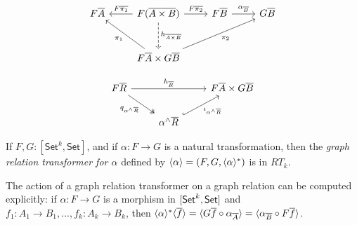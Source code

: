 \documentclass[runningheads]{llncs}
\newcommand{\set}{\mathsf{Set}}
\begin{document}
\begin{figure*}[ht]
\vspace*{-0.3in}
  \begin{minipage}[b]{0.25\linewidth}
{\footnotesize\[\begin{tikzcd}[row sep = large]
        F\overline{A}
        &F(\overline{A \times B})
        \ar[l, "{F\overline{\pi_1}}"']
        \ar[r, "{F\overline{\pi_2}}"]
        \ar[d, dashed, "{h_{\overline{A \times B}}}"]
        &F\overline{B}
        \ar[r, "{\alpha_{\ol{B}}}"]
        &G\overline{B} \\
        &F\overline{A} \times G\overline{B}
        \ar[ul, "{\pi_1}"] \ar[urr, "{\pi_2}"']
\end{tikzcd}\]}
  \end{minipage}
  \hspace*{1.4in}
  \begin{minipage}[b]{0.5\linewidth}
{\footnotesize\[\begin{tikzcd}
        F\overline{R}
        \ar[rr, "{h_{\overline{R}}}"]
        \ar[dr, twoheadrightarrow, "{q_{\alpha^\wedge\overline{R}}}"']
        &&F\overline{A} \times G\overline{B} \\
        &\alpha^\wedge\overline{R}
        \ar[ur, hookrightarrow, "{\iota_{\alpha^\wedge\overline{R}}}"']
\end{tikzcd}\]}
\end{minipage}\vspace*{-0.4in}
\end{figure*}

\begin{lemma}\label{lem:graph-reln-functors}
If $F,G : [\set^k,\set]$, and if $\alpha : F \to G$ is a natural
transformation, then the {\em graph relation transformer for $\alpha$}
defined by $\langle {\alpha} \rangle = (F, G, \langle {\alpha} \rangle^*)$ is in $RT_k$.
\end{lemma}

\noindent
The action of a graph relation transformer on a graph relation can be
computed explicitly:
if $\alpha : F \to G$ is a morphism in $[\mathsf{Set}^k, \mathsf{Set}]$
and $f_1: A_1 \to B_1, ..., f_k : A_k \to B_k$,
then $\langle {\alpha} \rangle^* \langle {\overline{f}} \rangle
= \langle G \overline{f} \circ \alpha_{\overline{A}} \rangle
= \langle \alpha_{\overline{B}} \circ F \overline{f} \rangle$.
\end{document}
